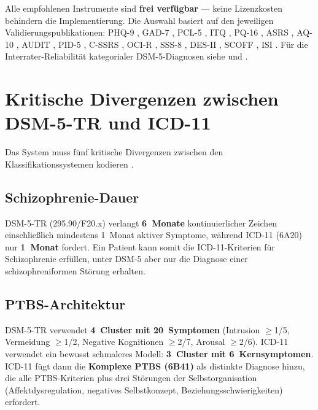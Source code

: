 \documentclass[11pt,a4paper]{article}
\begin{document}
Alle empfohlenen Instrumente sind \textbf{frei verf\"ugbar} --- keine Lizenzkosten behindern die Implementierung. Die Auswahl basiert auf den jeweiligen Validierungspublikationen: PHQ-9 \citep{Levis2019}, GAD-7 \citep{Spitzer2006}, PCL-5 \citep{Blevins2015}, ITQ \citep{Cloitre2018}, PQ-16 \citep{Ising2012}, ASRS \citep{Kessler2005}, AQ-10 \citep{Allison2012}, AUDIT \citep{Saunders1993}, PID-5 \citep{OltmannsWidiger2018, Zimmermann2021}, C-SSRS \citep{Posner2011}, OCI-R \citep{Foa2002}, SSS-8 \citep{Gierk2014}, DES-II \citep{CarlsonPutnam1993}, SCOFF \citep{Morgan1999}, ISI \citep{Morin2011}. F\"ur die Interrater-Reliabilit\"at kategorialer DSM-5-Diagnosen siehe \citet{Regier2013} und \citet{Aboraya2006}.


\section{Kritische Divergenzen zwischen DSM-5-TR und ICD-11}
\label{sec:divergenzen}

Das System muss f\"unf kritische Divergenzen zwischen den Klassifikationssystemen kodieren \citep{Keeley2016}.

\subsection{Schizophrenie-Dauer}

DSM-5-TR (295.90/F20.x) verlangt \textbf{6~Monate} kontinuierlicher Zeichen einschlie\ss{}lich mindestens 1~Monat aktiver Symptome, w\"ahrend ICD-11 (6A20) nur \textbf{1~Monat} fordert. Ein Patient kann somit die ICD-11-Kriterien f\"ur Schizophrenie erf\"ullen, unter DSM-5 aber nur die Diagnose einer schizophreniformen St\"orung erhalten.

\subsection{PTBS-Architektur}

DSM-5-TR verwendet \textbf{4~Cluster mit 20~Symptomen} (Intrusion $\geq$1/5, Vermeidung $\geq$1/2, Negative Kognitionen $\geq$2/7, Arousal $\geq$2/6). ICD-11 verwendet ein bewusst schmaleres Modell: \textbf{3~Cluster mit 6~Kernsymptomen}. ICD-11 f\"ugt dann die \textbf{Komplexe PTBS (6B41)} als distinkte Diagnose hinzu, die alle PTBS-Kriterien plus drei St\"orungen der Selbstorganisation (Affektdysregulation, negatives Selbstkonzept, Beziehungsschwierigkeiten) erfordert.
\end{document}
